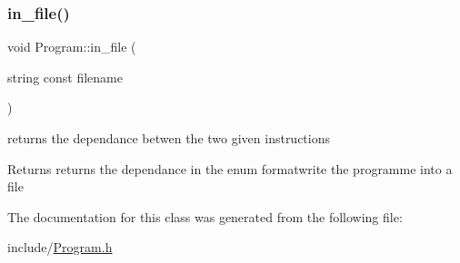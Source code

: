 \subsubsection{\texorpdfstring{in\+\_\+file()}{in\_file()}}
{\footnotesize\ttfamily void Program\+::in\+\_\+file (\begin{DoxyParamCaption}\item[{string const}]{filename }\end{DoxyParamCaption})}



returns the dependance betwen the two given instructions 

\begin{DoxyReturn}{Returns}
returns the dependance in the enum formatwrite the programme into a file 
\end{DoxyReturn}


The documentation for this class was generated from the following file\+:\begin{DoxyCompactItemize}
\item 
include/\mbox{\hyperlink{_program_8h}{Program.\+h}}\end{DoxyCompactItemize}
